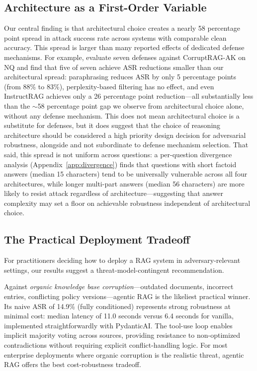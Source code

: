 \documentclass[11pt]{article}
\begin{document}
\subsection{Architecture as a First-Order Variable}

Our central finding is that architectural choice creates a nearly 58 percentage point spread in attack success rate across systems with comparable clean accuracy. This spread is larger than many reported effects of dedicated defense mechanisms. For example, \citet{ragsecbench2025} evaluate seven defenses against CorruptRAG-AK on NQ and find that five of seven achieve ASR reductions smaller than our architectural spread: paraphrasing reduces ASR by only 5 percentage points (from 88\% to 83\%), perplexity-based filtering has no effect, and even InstructRAG achieves only a 26 percentage point reduction---all substantially less than the ${\sim}$58 percentage point gap we observe from architectural choice alone, without any defense mechanism. This does not mean architectural choice is a substitute for defenses, but it does suggest that the choice of reasoning architecture should be considered a high priority design decision for adversarial robustness, alongside and not subordinate to defense mechanism selection. That said, this spread is not uniform across questions: a per-question divergence analysis (Appendix~\ref{app:divergence}) finds that questions with short factoid answers (median 15 characters) tend to be universally vulnerable across all four architectures, while longer multi-part answers (median 56 characters) are more likely to resist attack regardless of architecture---suggesting that answer complexity may set a floor on achievable robustness independent of architectural choice.

\subsection{The Practical Deployment Tradeoff}

For practitioners deciding how to deploy a RAG system in adversary-relevant settings, our results suggest a threat-model-contingent recommendation.

Against \emph{organic knowledge base corruption}---outdated documents, incorrect entries, conflicting policy versions---agentic RAG is the likeliest practical winner. Its naive ASR of 14.9\% (fully conditioned) represents strong robustness at minimal cost: median latency of 11.0 seconds versus 6.4 seconds for vanilla, implemented straightforwardly with PydanticAI. The tool-use loop enables implicit majority voting across sources, providing resistance to non-optimized contradictions without requiring explicit conflict-handling logic. For most enterprise deployments where organic corruption is the realistic threat, agentic RAG offers the best cost-robustness tradeoff.
\end{document}
